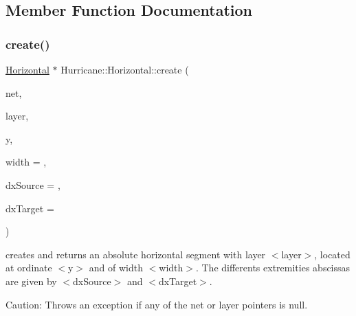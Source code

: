\subsection{Member Function Documentation}
\mbox{\label{classHurricane_1_1Horizontal_a15f13508993b6c0219fb944fe1141c3f}} 
\subsubsection{\texorpdfstring{create()}{create()}\hspace{0.1cm}{\footnotesize\ttfamily [1/2]}}
{\footnotesize\ttfamily \hyperlink{classHurricane_1_1Horizontal}{Horizontal} $\ast$ Hurricane\+::\+Horizontal\+::create (\begin{DoxyParamCaption}\item[{\hyperlink{classHurricane_1_1Net}{Net} $\ast$}]{net,  }\item[{const \hyperlink{classHurricane_1_1Layer}{Layer} $\ast$}]{layer,  }\item[{const \hyperlink{group__DbUGroup_ga4fbfa3e8c89347af76c9628ea06c4146}{Db\+U\+::\+Unit} \&}]{y,  }\item[{const \hyperlink{group__DbUGroup_ga4fbfa3e8c89347af76c9628ea06c4146}{Db\+U\+::\+Unit} \&}]{width = {},  }\item[{const \hyperlink{group__DbUGroup_ga4fbfa3e8c89347af76c9628ea06c4146}{Db\+U\+::\+Unit} \&}]{dx\+Source = {},  }\item[{const \hyperlink{group__DbUGroup_ga4fbfa3e8c89347af76c9628ea06c4146}{Db\+U\+::\+Unit} \&}]{dx\+Target = {} }\end{DoxyParamCaption})\hspace{0.3cm}{\ttfamily [static]}}

creates and returns an absolute horizontal segment with layer {\ttfamily $<$layer$>$}, located at ordinate {\ttfamily $<$y$>$} and of width {\ttfamily $<$width$>$}. The differents extremities abscissas are given by {\ttfamily $<$dx\+Source$>$} and {\ttfamily $<$dx\+Target$>$}.

\begin{DoxyParagraph}{Caution\+:}
Throws an exception if any of the net or layer pointers is null. 
\end{DoxyParagraph}
\mbox{\label{classHurricane_1_1Horizontal_ac30e0cbdfdd1f2cb02f000380652daf7}} 
